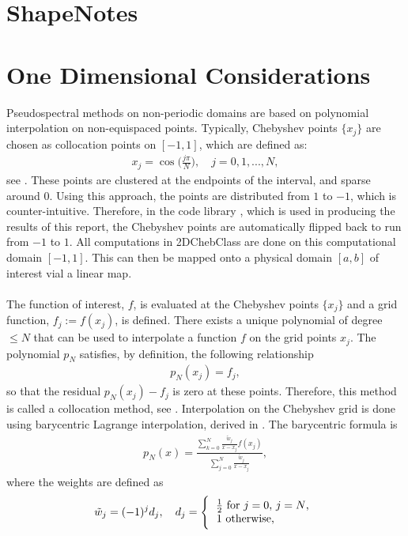 \documentclass[11pt, a4paper]{article}
\theoremstyle{definition}
\begin{document}
\section*{ShapeNotes}	
\section{One Dimensional Considerations}
Pseudospectral methods on non-periodic domains are based on polynomial interpolation on non-equispaced points.  
Typically, Chebyshev points $\{x_j\}$ are chosen as collocation points on $[-1,1]$, which are defined as:
\begin{align}\label{defChebyshevPoints}
	x_j= \cos\bigg(\frac{j \pi}{N}\bigg), \quad j=0,1,...,N,
\end{align}	
see \cite{bibTrefethen}.
These points are clustered at the endpoints of the interval, and sparse around $0$. Using this approach, the points are distributed from $1$ to $-1$, which is counter-intuitive. Therefore, in the code library \cite{GoddardPseudospectralCode1}, which is used in producing the results of this report, the Chebyshev points are automatically flipped back to run from $-1$ to $1$. All computations in 2DChebClass are done on this computational domain $[-1,1]$. This can then be mapped onto a physical domain $[a,b]$ of interest vial a linear map.
\\
\\
The function of interest, $f$, is evaluated at the Chebyshev points $\{x_j\}$ and a grid function, $f_j := f(x_j)$, is defined. There exists a unique polynomial of degree $\leq N$ that can be used to interpolate a function $f$ on the grid points $x_j$. The polynomial $p_N$ satisfies, by definition, the following relationship
\begin{align}\label{eqnptov1}
	p_N(x_j)=f_j,
\end{align}
so that the residual $p_N(x_j) -f_j$ is zero at these points. Therefore, this method is called a collocation method, see \cite{Boyd1}. Interpolation on the Chebyshev grid is done using barycentric Lagrange interpolation, derived in \cite{bibTrefethenBerrut1}. The barycentric formula is
\begin{align*}
	p_N(x)= \frac{\displaystyle \sum_{k=0}^N \frac{\tilde w_j}{x-x_j}f(x_j)}{\displaystyle \sum_{j=0}^N \frac{\tilde w_j}{x-x_j}},
\end{align*}
where the weights are defined as
\begin{align*}
	\tilde w_j = (-1)^j d_j, \quad d_j = 
	\left \{
	\begin{tabular}{c}
		$\frac{1}{2}$ \text{for} $j=0$, $j=N$, \\
		$1$ \text{otherwise}, \phantom{abksla} 
	\end{tabular}
	\right .
\end{align*}
\end{document}
